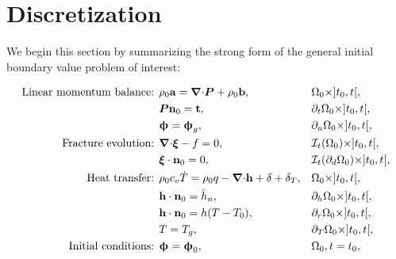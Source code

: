\section{Discretization}
\label{section: Chapter2/discretization}

We begin this section by summarizing the strong form of the general initial boundary value problem of interest:
\begin{mdframed}[
  frametitle={The initial boundary value problem for the time interval $t \in I = [t_0, t_f]$},
  frametitlebackgroundcolor=gray!20,
  backgroundcolor=gray!5,
  linewidth=0pt,
  nobreak=true
  ]
  \vspace{-1em}
  \begin{align*}
    \text{Linear momentum balance: } & \rho_0 \bta = \divergence \bfP + \rho_0 \btb,                       &  & \body_0 \times ]t_0, t[,                          \\
                                     & \bfP \normal_0 = \btt,                                              &  & \partial_t\body_0 \times ]t_0, t[,                \\
                                     & \bs{\upphi} = \bs{\upphi}_g,                                        &  & \partial_u\body_0 \times ]t_0, t[,                \\
    \text{Fracture evolution: }      & \divergence \bs{\xi} - f = 0,                                       &  & \mathcal{I}_t(\body_0) \times ]t_0, t[,           \\
                                     & \bs{\xi}\cdot\normal_0 = 0,                                         &  & \mathcal{I}_t(\partial_d\body_0) \times ]t_0, t[, \\
    \text{Heat transfer: }           & \rho_0c_v\dot{T} = \rho_0 q - \divergence \bth + \delta + \delta_T, &  & \body_0 \times ]t_0, t[,                          \\
                                     & \bth \cdot \normal_0 = \bar{h}_n,                                   &  & \partial_h\body_0 \times ]t_0, t[,                \\
                                     & \bth \cdot \normal_0 = h(T - T_0),                                  &  & \partial_r\body_0 \times ]t_0, t[,                \\
                                     & T = T_g,                                                            &  & \partial_T\body_0 \times ]t_0, t[,                \\
    \text{Initial conditions: }      & \bs{\upphi} = \bs{\upphi}_0,                                        &  & \body_0, t = t_0,                                 \\

\end{align*}
\end{mdframed}
